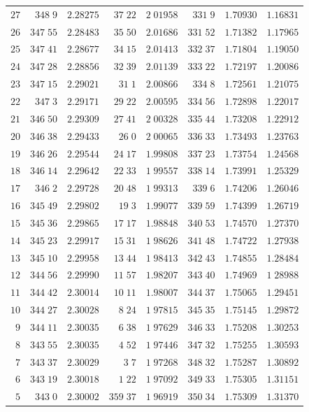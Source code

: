 \begin{center}
\begin{tabular}{r|r|r|r|r|r|r|r}
$27$&$348\;9$&$2.28275$&$37\;22$&$2\;01958$&$331\;9$&$1.70930$&$1.16831$\\
$26$&$347\;55$&$2.28483$&$35\;50$&$2.01686$&$331\;52$&$1.71382$&$1.17965$\\[2pt]
$25$&$347\;41$&$2.28677$&$34\;15$&$2.01413$&$332\;37$&$1.71804$&$1.19050$\\
$24$&$347\;28$&$2.28856$&$32\;39$&$2.01139$&$333\;22$&$1.72197$&$1.20086$\\
$23$&$347\;15$&$2.29021$&$31\;1$&$2.00866$&$334\;8$&$1.72561$&$1.21075$\\
$22$&$347\;3$&$2.29171$&$29\;22$&$2.00595$&$334\;56$&$1.72898$&$1.22017$\\
$21$&$346\;50$&$2.29309$&$27\;41$&$2\;00328$&$335\;44$&$1.73208$&$1.22912$\\[2pt]
$20$&$346\;38$&$2.29433$&$26\;0$&$2\;00065$&$336\;33$&$1.73493$&$1.23763$\\
$19$&$346\;26$&$2.29544$&$24\;17$&$1.99808$&$337\;23$&$1.73754$&$1.24568$\\
$18$&$346\;14$&$2.29642$&$22\;33$&$1\;99557$&$338\;14$&$1.73991$&$1.25329$\\
$17$&$346\;2$&$2.29728$&$20\;48$&$1\;99313$&$339\;6$&$1.74206$&$1.26046$\\
$16$&$345\;49$&$2.29802$&$19\;3$&$1.99077$&$339\;59$&$1.74399$&$1.26719$\\[2pt]
$15$&$345\;36$&$2.29865$&$17\;17$&$1.98848$&$340\;53$&$1.74570$&$1.27370$\\
$14$&$345\;23$&$2.29917$&$15\;31$&$1\;98626$&$341\;48$&$1.74722$&$1.27938$\\
$13$&$345\;10$&$2.29958$&$13\;44$&$1\;98413$&$342\;43$&$1.74855$&$1.28484$\\
$12$&$344\;56$&$2.29990$&$11\;57$&$1.98207$&$343\;40$&$1.74969$&$1\;28988$\\
$11$&$344\;42$&$2.30014$&$10\;11$&$1.98007$&$344\;37$&$1.75065$&$1.29451$\\[2pt]
$10$&$344\;27$&$2.30028$&$8\;24$&$1\;97815$&$345\;35$&$1.75145$&$1.29872$\\
$9$&$344\;11$&$2.30035$&$6\;38$&$1\;97629$&$346\;33$&$1.75208$&$1.30253$\\
$8$&$343\;55$&$2.30035$&$4\;52$&$1\;97446$&$347\;32$&$1.75255$&$1.30593$\\
$7$&$343\;37$&$2.30029$&$3\;7$&$1\;97268$&$348\;32$&$1.75287$&$1.30892$\\
$6$&$343\;19$&$2.30018$&$1\;22$&$1\;97092$&$349\;33$&$1.75305$&$1.31151$\\[2pt]
$5$&$343\;0$&$2.30002$&$359\;37$&$1\;96919$&$350\;34$&$1.75309$&$1.31370$\\

\end{tabular}
\end{center}
